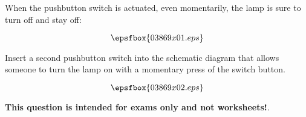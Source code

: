

When the pushbutton switch is actuated, even momentarily, the lamp is sure to turn off and stay off:

$$\epsfbox{03869x01.eps}$$

Insert a second pushbutton switch into the schematic diagram that allows someone to turn the lamp on with a momentary press of the switch button.







$$\epsfbox{03869x02.eps}$$







{\bf This question is intended for exams only and not worksheets!}.



